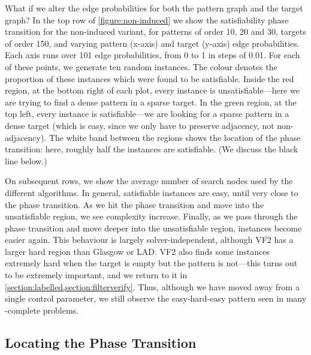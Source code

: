 \documentclass[twoside,11pt]{article}
\begin{document}
What if we alter the edge probabilities for both the pattern graph and the target graph?  In the top
row of \cref{figure:non-induced} we show the satisfiability phase transition for the non-induced
variant, for patterns of order 10, 20 and 30, targets of order 150, and varying pattern (x-axis) and
target (y-axis) edge probabilities. Each axis runs over 101 edge probabilities, from 0 to 1 in steps
of 0.01. For each of these points, we generate ten random instances. The colour denotes the
proportion of these instances which were found to be satisfiable.  Inside the red region, at the
bottom right of each plot, every instance is unsatisfiable---here we are trying to find a dense
pattern in a sparse target. In the green region, at the top left, every instance is
satisfiable---we are looking for a sparse pattern in a dense target (which is easy, since we only
have to preserve adjacency, not non-adjacency). The white band between the regions shows the
location of the phase transition: here, roughly half the instances are satisfiable. (We discuss the
black line below.)

On subsequent rows, we show the average number of search nodes used by the different algorithms. In
general, satisfiable instances are easy, until very close to the phase transition. As we hit the
phase transition and move into the unsatisfiable region, we see complexity increase. Finally, as we
pass through the phase transition and move deeper into the unsatisfiable region, instances become
easier again. This behaviour is largely solver-independent, although VF2 has a larger hard region
than Glasgow or LAD. VF2 also finds some instances extremely hard when the target is empty but the
pattern is not---this turns out to be extremely important, and we return to it in
\cref{section:labelled,section:filterverify}. Thus, although we have moved away from a single
control parameter, we still observe the easy-hard-easy pattern seen in many \NP-complete
problems.

\subsection{Locating the Phase Transition}
\end{document}
